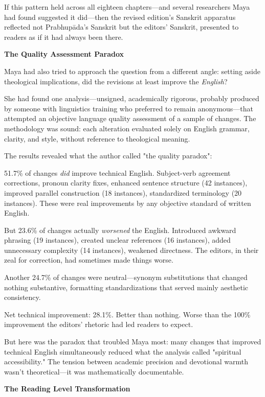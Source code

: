 \documentclass[12pt,twoside]{book}
\begin{document}
If this pattern held across all eighteen chapters—and several researchers Maya had found suggested it did—then the revised edition's Sanskrit apparatus reflected not Prabhupāda's Sanskrit but the editors' Sanskrit, presented to readers as if it had always been there.

\textbf{\textbf{The Quality Assessment Paradox}}

Maya had also tried to approach the question from a different angle: setting aside theological implications, did the revisions at least improve the \emph{English}?

She had found one analysis—unsigned, academically rigorous, probably produced by someone with linguistics training who preferred to remain anonymous—that attempted an objective language quality assessment of a sample of changes. The methodology was sound: each alteration evaluated solely on English grammar, clarity, and style, without reference to theological meaning.

The results revealed what the author called "the quality paradox":

51.7\% of changes \emph{did} improve technical English. Subject-verb agreement corrections, pronoun clarity fixes, enhanced sentence structure (42 instances), improved parallel construction (18 instances), standardized terminology (20 instances). These were real improvements by any objective standard of written English.

But 23.6\% of changes actually \emph{worsened} the English. Introduced awkward phrasing (19 instances), created unclear references (16 instances), added unnecessary complexity (14 instances), weakened directness. The editors, in their zeal for correction, had sometimes made things worse.

Another 24.7\% of changes were neutral—synonym substitutions that changed nothing substantive, formatting standardizations that served mainly aesthetic consistency.

Net technical improvement: 28.1\%. Better than nothing. Worse than the 100\% improvement the editors' rhetoric had led readers to expect.

But here was the paradox that troubled Maya most: many changes that improved technical English simultaneously reduced what the analysis called "spiritual accessibility." The tension between academic precision and devotional warmth wasn't theoretical—it was mathematically documentable.

\textbf{\textbf{The Reading Level Transformation}}
\end{document}
